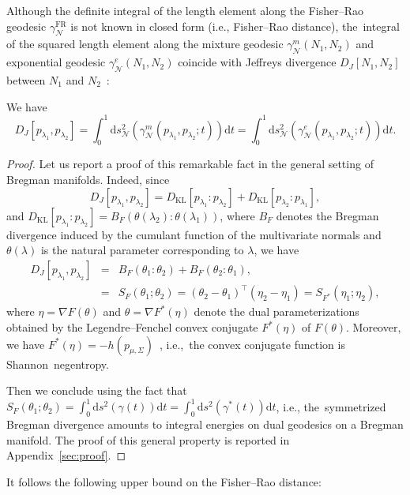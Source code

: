 \documentclass[entropy,article,accept,oneauthor,pdftex,entropy]{Definitions/mdpi}
\def\KL{\mathrm{KL}}
\def\calN{\mathcal{N}}
\def\dt{\mathrm{d}t}
\def\ds{\mathrm{d}s}
\begin{document}
 
Although the definite integral of the length element along the Fisher–Rao geodesic $\gamma_\calN^{\mathrm{FR}}$ is not known in closed form (i.e., Fisher–Rao distance), the~integral of the squared length element along the mixture geodesic $\gamma_\calN^m(N_1,N_2)$ 
and exponential geodesic $\gamma_\calN^e(N_1,N_2)$ coincide with Jeffreys divergence $D_J[N_1,N_2]$ between $N_1$ and $N_2$~\cite{IG-2016}:

\begin{Property}[\cite{IG-2016}]\label{prop:geolengthJeffreys}
We have $$
D_J[p_{\lambda_1},p_{\lambda_2}]=\int_0^1 \ds_\calN^2(\gamma^m_\calN(p_{\lambda_1},p_{\lambda_2};t))\dt =
\int_0^1 \ds_\calN^2(\gamma^e_\calN(p_{\lambda_1},p_{\lambda_2};t))\dt.
$$
\end{Property}

\begin{proof}
Let us report a proof of this remarkable fact in the general setting of Bregman manifolds.
Indeed, since 
$$
D_J[p_{\lambda_1},p_{\lambda_2}]=D_\KL[p_{\lambda_1}:p_{\lambda_2}]+D_\KL[p_{\lambda_2}:p_{\lambda_1}],
$$
and $D_\KL[p_{\lambda_1}:p_{\lambda_2}]=B_F(\theta(\lambda_2):\theta(\lambda_1))$, where $B_F$ denotes the Bregman divergence induced by the cumulant function of the multivariate normals and $\theta(\lambda)$ is the natural parameter corresponding to $\lambda$, we have
\begin{eqnarray*}
D_J[p_{\lambda_1},p_{\lambda_2}]&=&B_F(\theta_1:\theta_2)+B_F(\theta_2:\theta_1),\\
&=& S_F(\theta_1;\theta_2)=(\theta_2-\theta_1)^\top (\eta_2-\eta_1)=S_{F^*}(\eta_1;\eta_2),
\end{eqnarray*}
where $\eta=\nabla F(\theta)$ and $\theta=\nabla F^*(\eta)$ denote the dual parameterizations obtained by the Legendre–Fenchel convex conjugate  $F^*(\eta)$ of $F(\theta)$. Moreover, we have $F^*(\eta)=-h(p_{\mu,\Sigma})$~\cite{IG-2016}, i.e.,~the convex conjugate function is Shannon~negentropy.

Then we conclude using the fact that $S_F(\theta_1;\theta_2)=\int_0^1 \ds^2(\gamma(t))\dt=\int_0^1 \ds^2(\gamma^*(t))\dt$, 
i.e., the~symmetrized Bregman divergence amounts to integral energies on dual geodesics on a Bregman manifold.
The proof of this general property is reported in Appendix~\ref{sec:proof}.
\end{proof}
 
 

It follows the following upper bound on the Fisher--Rao distance:
\end{document}
